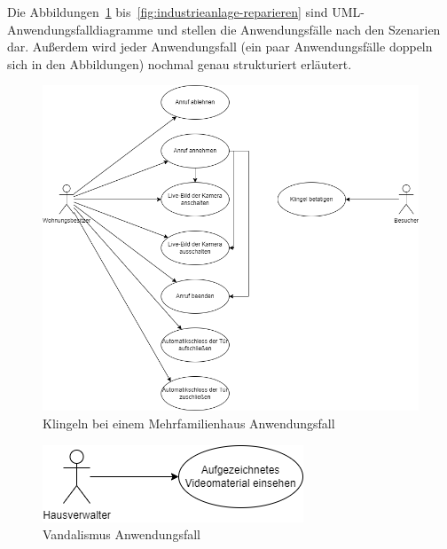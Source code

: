 Die Abbildungen~\ref{fig:klingeln-bei-einem-mehrfamilienhaus} bis~\ref{fig:industrieanlage-reparieren} sind UML-Anwendungsfalldiagramme und stellen die Anwendungsfälle nach den Szenarien dar.
Außerdem wird jeder Anwendungsfall (ein paar Anwendungsfälle doppeln sich in den Abbildungen) nochmal genau strukturiert erläutert.

\begin{figure}[ht!]
    \centering
    \includegraphics[width=\paperwidth-2in]{../assets/img/UML-Anwendungsfalldiagramme-Klingeln bei einem Mehrfamilienhaus}
    \caption{Klingeln bei einem Mehrfamilienhaus Anwendungsfall}
    \label{fig:klingeln-bei-einem-mehrfamilienhaus}
\end{figure}

\begin{figure}[ht!]
    \centering
    \includegraphics[width=(\paperwidth-2in)/2]{../assets/img/UML-Anwendungsfalldiagramme-Vandalismus.drawio}
    \caption{Vandalismus Anwendungsfall}
    \label{fig:vandalismus}
\end{figure}

